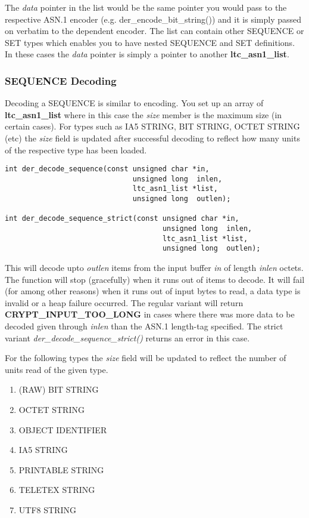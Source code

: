 \documentclass[synpaper]{book}
\begin{document}
The \textit{data} pointer in the list would be the same pointer you would pass to the respective ASN.1 encoder (e.g. der\_encode\_bit\_string()) and it is simply passed on
verbatim to the dependent encoder.  The list can contain other SEQUENCE or SET types which enables you to have nested SEQUENCE and SET definitions.  In these cases
the \textit{data} pointer is simply a pointer to another \textbf{ltc\_asn1\_list}.

\subsubsection{SEQUENCE Decoding}


Decoding a SEQUENCE is similar to encoding.  You set up an array of \textbf{ltc\_asn1\_list} where in this case the \textit{size} member is the maximum size
(in certain cases).  For types such as IA5 STRING, BIT STRING, OCTET STRING (etc) the \textit{size} field is updated after successful decoding to reflect how many
units of the respective type has been loaded.

\begin{verbatim}
int der_decode_sequence(const unsigned char *in,
                              unsigned long  inlen,
                              ltc_asn1_list *list,
                              unsigned long  outlen);

int der_decode_sequence_strict(const unsigned char *in,
                                     unsigned long  inlen,
                                     ltc_asn1_list *list,
                                     unsigned long  outlen);
\end{verbatim}

This will decode upto \textit{outlen} items from the input buffer \textit{in} of length \textit{inlen} octets.  The function will stop (gracefully) when it runs out of items to decode.
It will fail (for among other reasons) when it runs out of input bytes to read, a data type is invalid or a heap failure occurred.
The regular variant will return \textbf{CRYPT\_INPUT\_TOO\_LONG} in cases where there was more data to be decoded given through \textit{inlen} than the ASN.1 length-tag specified.
The strict variant \textit{der\_decode\_sequence\_strict()} returns an error in this case.

For the following types the \textit{size} field will be updated to reflect the number of units read of the given type.
\begin{enumerate}
   \item (RAW) BIT STRING
   \item OCTET STRING
   \item OBJECT IDENTIFIER
   \item IA5 STRING
   \item PRINTABLE STRING
   \item TELETEX STRING
   \item UTF8 STRING
\end{enumerate}
\end{document}

